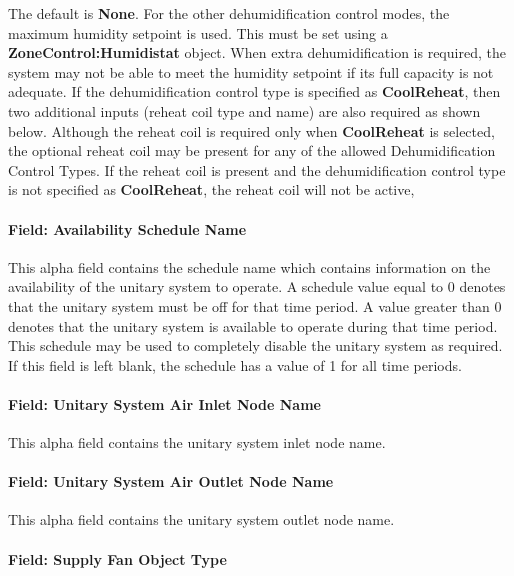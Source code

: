 The default is \textbf{None}. For the other dehumidification control modes, the maximum humidity setpoint is used. This must be set using a \textbf{ZoneControl:Humidistat} object. When extra dehumidification is required, the system may not be able to meet the humidity setpoint if its full capacity is not adequate. If the dehumidification control type is specified as \textbf{CoolReheat}, then two additional inputs (reheat coil type and name) are also required as shown below. Although the reheat coil is required only when \textbf{CoolReheat} is selected, the optional reheat coil may be present for any of the allowed Dehumidification Control Types. If the reheat coil is present and the dehumidification control type is not specified as \textbf{CoolReheat}, the reheat coil will not be active,

\paragraph{Field: Availability Schedule Name}\label{field-availability-schedule-name-017}

This alpha field contains the schedule name which contains information on the availability of the unitary system to operate. A schedule value equal to 0 denotes that the unitary system must be off for that time period. A value greater than 0 denotes that the unitary system is available to operate during that time period. This schedule may be used to completely disable the unitary system as required. If this field is left blank, the schedule has a value of 1 for all time periods.

\paragraph{Field: Unitary System Air Inlet Node Name}\label{field-unitary-system-air-inlet-node-name}

This alpha field contains the unitary system inlet node name.

\paragraph{Field: Unitary System Air Outlet Node Name}\label{field-unitary-system-air-outlet-node-name}

This alpha field contains the unitary system outlet node name.

\paragraph{Field: Supply Fan Object Type}\label{field-supply-fan-object-type-000}

